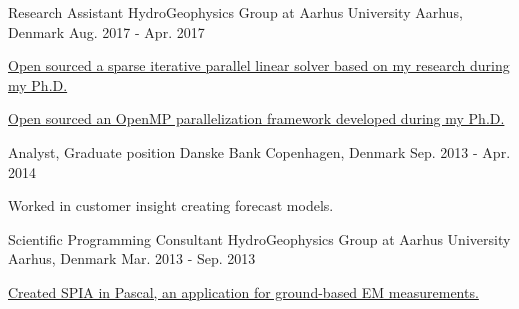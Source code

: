 \begin{cventries}
  \cventry
    {Research Assistant} %
    {HydroGeophysics Group at Aarhus University} %
    {Aarhus, Denmark} %
    {Aug. 2017 - Apr. 2017} %
    {
      \begin{cvitems} %
        \item {\href{https://github.com/tueboesen/Sparse-iterative-parallel-linear-solver}{Open sourced a sparse iterative parallel linear solver based on my research during my Ph.D.}}
        \item {\href{https://github.com/tueboesen/Parallelization-Framework}{Open sourced an OpenMP parallelization framework developed during my Ph.D.}}
      \end{cvitems}
    }

  \cventry
    {Analyst, Graduate position} %
    {Danske Bank} %
    {Copenhagen, Denmark} %
    {Sep. 2013 - Apr. 2014} %
    {
      \begin{cvitems} %
        \item {Worked in customer insight creating forecast models.}
      \end{cvitems}
    }

  \cventry
    {Scientific Programming Consultant} %
    {HydroGeophysics Group at Aarhus University} %
    {Aarhus, Denmark} %
    {Mar. 2013 - Sep. 2013} %
    {
      \begin{cvitems} %
        \item {\href{https://hgg.au.dk/software/spia}{Created SPIA in Pascal, an application for ground-based EM measurements.}}
      \end{cvitems}
    }


\end{cventries}
